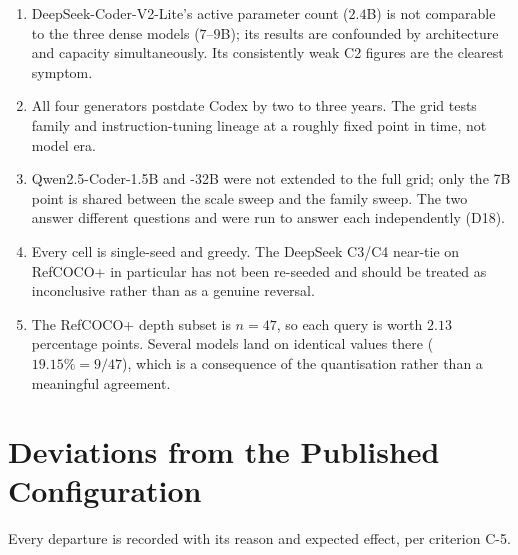 \documentclass[12pt,a4paper,oneside]{report}
\begin{document}
\begin{enumerate}[leftmargin=1.6em, itemsep=3pt]
\item DeepSeek-Coder-V2-Lite's active parameter count ($2.4$B) is not comparable to
the three dense models ($7$--$9$B); its results are confounded by architecture and
capacity simultaneously. Its consistently weak C2 figures are the clearest symptom.

\item All four generators postdate Codex by two to three years. The grid tests family
and instruction-tuning lineage at a roughly fixed point in time, not model era.

\item Qwen2.5-Coder-1.5B and -32B were not extended to the full grid; only the 7B
point is shared between the scale sweep and the family sweep. The two answer different
questions and were run to answer each independently (D18).

\item Every cell is single-seed and greedy. The DeepSeek C3/C4 near-tie on RefCOCO+
in particular has not been re-seeded and should be treated as inconclusive rather than
as a genuine reversal.

\item The RefCOCO+ depth subset is $n=47$, so each query is worth $2.13$ percentage
points. Several models land on identical values there ($19.15\% = 9/47$), which is a
consequence of the quantisation rather than a meaningful agreement.
\end{enumerate}

\chapter{Deviations from the Published Configuration}
\label{ch:deviations}

Every departure is recorded with its reason and expected effect, per criterion C-5.
\end{document}

